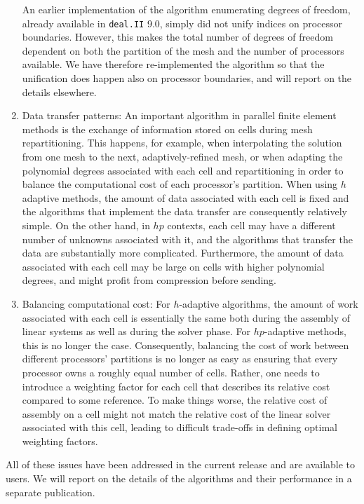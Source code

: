 \documentclass{ansarticle-preprint}
\newcommand{\specialword}[1]{\texttt{#1}}
\newcommand{\dealii}{{\specialword{deal.II}}\xspace}
\begin{document}
\begin{enumerate}
  An earlier implementation of the algorithm enumerating degrees of
  freedom, already available in \dealii{} 9.0, simply did not unify
  indices on processor boundaries. However, this makes the total
  number of degrees of freedom dependent on both the partition of the
  mesh and the number of processors available. We have therefore
  re-implemented the algorithm so that the unification does happen
  also on processor boundaries, and will report on the details
  elsewhere.

\item Data transfer patterns: An important algorithm in parallel
  finite element methods is the exchange of information stored on
  cells during mesh repartitioning. This happens, for example, when
  interpolating the solution from one mesh to the next,
  adaptively-refined mesh, or when adapting the polynomial degrees
  associated with each cell and repartitioning in order to
  balance the computational cost of each processor's partition. When
  using $h$ adaptive methods, the amount of data associated with each
  cell is fixed and the algorithms that implement the data transfer
  are consequently relatively simple. On the other hand, in $hp$
  contexts, each cell may have a different number of unknowns
  associated with it, and the algorithms that transfer the data are
  substantially more complicated. Furthermore, the amount of data
  associated with each cell may be large on cells with higher
  polynomial degrees, and might profit from compression before
  sending.

\item Balancing computational cost: For $h$-adaptive algorithms, the
  amount of work associated with each cell is essentially the same
  both during the assembly of linear systems as well as during the
  solver phase. For $hp$-adaptive methods, this is no longer the
  case. Consequently, balancing the cost of work between different
  processors' partitions is no longer as easy as ensuring that every
  processor owns a roughly equal number of cells. Rather, one needs to
  introduce a weighting factor for each cell that describes its
  relative cost compared to some reference. To make things worse, the
  relative cost of assembly on a cell might not match the relative
  cost of the linear solver associated with this cell, leading to
  difficult trade-offs in defining optimal weighting factors.
\end{enumerate}

All of these issues have been addressed in the current release and are
available to users. We will report on the details of the algorithms
and their performance in a separate publication.
\end{document}
